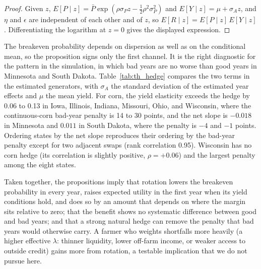 \documentclass[11pt,letterpaper]{article}
\theoremstyle{remark}
\begin{document}
\begin{proof}
Given $z$, $E[P\mid z]=\bar P\exp(\rho\sigma_Pz-\tfrac12\rho^2\sigma_P^2)$ and $E[Y\mid z]=\mu+\sigma_Az$, and $\eta$ and $\epsilon$ are independent of each other and of $z$, so $E[R\mid z]=E[P\mid z]\,E[Y\mid z]$. Differentiating the logarithm at $z=0$ gives the displayed expression.
\end{proof}

The breakeven probability depends on dispersion as well as on the conditional mean, so the proposition signs only the first channel. It is the right diagnostic for the pattern in the simulation, in which bad years are no worse than good years in Minnesota and South Dakota. Table~\ref{tab:th_hedge} compares the two terms in the estimated generators, with $\sigma_A$ the standard deviation of the estimated year effects and $\mu$ the mean yield. For corn, the yield elasticity exceeds the hedge by 0.06 to 0.13 in Iowa, Illinois, Indiana, Missouri, Ohio, and Wisconsin, where the continuous-corn bad-year penalty is 14 to 30 points, and the net slope is $-0.018$ in Minnesota and $0.011$ in South Dakota, where the penalty is $-4$ and $-1$ points. Ordering states by the net slope reproduces their ordering by the bad-year penalty except for two adjacent swaps (rank correlation 0.95). Wisconsin has no corn hedge (its correlation is slightly positive, $\rho=+0.06$) and the largest penalty among the eight states.

\begin{table}[H]
\centering
\caption{Check of Proposition~\ref{prop:hedge}, medium NCCPI zone. $\sigma_A/\mu$ is the standard deviation of the estimated year effects divided by the mean yield; $|\rho|\sigma_P$ is the price hedge; Net is $\sigma_A/\mu+\rho\sigma_P$ for corn; the hedge column shows $-\rho\sigma_P$, which equals $|\rho|\sigma_P$ when $\rho<0$ and is negative in Wisconsin ($\rho>0$). The last column is the continuous-corn breakeven probability in bad years minus that in good years, in percentage points.}
\label{tab:th_hedge}

\end{table}

Taken together, the propositions imply that rotation lowers the breakeven probability in every year, raises expected utility in the first year when its yield conditions hold, and does so by an amount that depends on where the margin sits relative to zero; that the benefit shows no systematic difference between good and bad years; and that a strong natural hedge can remove the penalty that bad years would otherwise carry. A farmer who weights shortfalls more heavily (a higher effective $\lambda$: thinner liquidity, lower off-farm income, or weaker access to outside credit) gains more from rotation, a testable implication that we do not pursue here.
\end{document}
